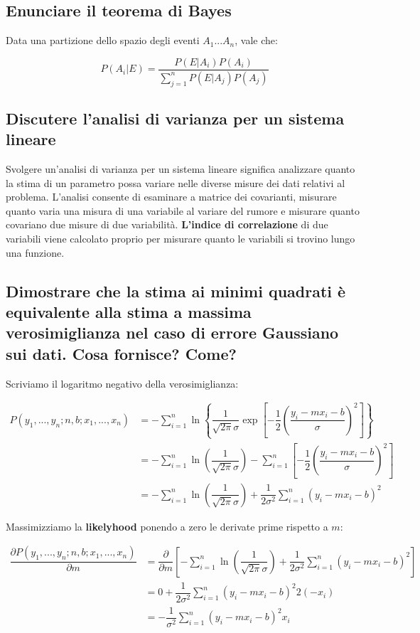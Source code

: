 \documentclass[\main/main.tex]{subfiles}
\begin{document}
\subsection{Enunciare il teorema di Bayes}
Data una partizione dello spazio degli eventi $A_1...A_n$, vale che:

\[
	P(A_i|E) = \dfrac{P(E|A_i)P(A_i)}{\sum_{j=1}^n P(E|A_j)P(A_j)}
\]

\subsection{Discutere l'analisi di varianza per un sistema lineare}
Svolgere un'analisi di varianza per un sistema lineare significa analizzare quanto la stima di un parametro possa variare nelle diverse misure dei dati relativi al problema. 
L'analisi consente di esaminare a matrice dei covarianti, misurare quanto varia una misura di una variabile al variare del rumore e misurare quanto covariano due misure di due variabilità.
\textbf{L'indice di correlazione} di due variabili viene calcolato proprio per misurare quanto le variabili si trovino lungo una funzione.

\subsection{Dimostrare che la stima ai minimi quadrati è equivalente alla stima a massima verosimiglianza nel caso di errore Gaussiano sui dati. Cosa fornisce? Come?}
Scriviamo il logaritmo negativo della verosimiglianza:

\begin{align}
P \left(y_1,...,y_n; n, b; x_1, ..., x_n \right)  &=
	- \sum_{i=1}^n 
	\ln \left\{
		\dfrac{1}{\sqrt{2\pi}\sigma}
		\exp \left[
		-\dfrac{1}{2}	\left(\dfrac{ y_i - mx_i - b}{\sigma} \right)^2
	 	\right]
	 \right\}\\
	 &= 
	 - \sum_{i=1}^n \ln
	 \left ( \dfrac{1}{\sqrt{2\pi}\sigma} \right )
	 - \sum_{i=1}^n
		\left[
		-\dfrac{1}{2}	\left(\dfrac{ y_i - mx_i - b}{\sigma} \right)^2
	 	\right]\\
	 &= 
	 - \sum_{i=1}^n \ln
	 \left ( \dfrac{1}{\sqrt{2\pi}\sigma} \right )
	 + \dfrac{1}{2\sigma^2} \sum_{i=1}^n
		\left(y_i - mx_i - b \right)^2
\end{align}

Massimizziamo la \textbf{likelyhood} ponendo a zero le derivate prime rispetto a $m$:

\begin{align}
	\dfrac{\partial P \left(y_1,...,y_n; n, b; x_1, ..., x_n \right)}{\partial m}  &= \dfrac{\partial}{\partial m} \left [ - \sum_{i=1}^n \ln
	 \left ( \dfrac{1}{\sqrt{2\pi}\sigma} \right )
	 + \dfrac{1}{2\sigma^2} \sum_{i=1}^n
		\left(y_i - mx_i - b \right)^2
	 	 \right ]\\
	 &= 0 + \dfrac{1}{2\sigma^2} \sum_{i=1}^n \left(y_i - mx_i - b \right)^2 2 (-x_i)\\
	 &= -\dfrac{1}{\sigma^2} \sum_{i=1}^n \left(y_i - mx_i - b \right)^2  x_i
\end{align}
\end{document}
